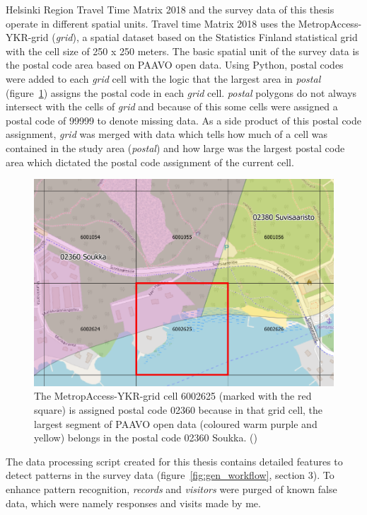 Helsinki Region Travel Time Matrix 2018 and the survey data of this thesis operate in different spatial units. Travel time Matrix 2018 uses the MetropAccess-YKR-grid (\textit{grid}), a spatial dataset based on the Statistics Finland statistical grid with the cell size of 250 x 250 meters. The basic spatial unit of the survey data is the postal code area based on PAAVO open data. Using Python, postal codes were added to each \textit{grid} cell with the logic that the largest area in \textit{postal} (figure~\ref{fig:paavo_ykr}) assigns the postal code in each \textit{grid} cell. \textit{postal} polygons do not always intersect with the cells of \textit{grid} and because of this some cells were assigned a postal code of 99999 to denote missing data. As a side product of this postal code assignment, \textit{grid} was merged with data which tells how much of a cell was contained in the study area (\textit{postal}) and how large was the largest postal code area which dictated the postal code assignment of the current cell.

\begin{figure}[H]%
    \includegraphics[width=\textwidth]{images/paavo-ykr.png}
    \caption[Assigning MetropAccess-YKR-grid postal codes]{The MetropAccess-YKR-grid cell 6002625 (marked with the red square) is assigned postal code 02360 because in that grid cell, the largest segment of PAAVO open data (coloured warm purple and yellow) belongs in the postal code 02360 Soukka. (\cite{OpenStreetMap})}%
    \label{fig:paavo_ykr}%
\end{figure}

The data processing script created for this thesis contains detailed features to detect patterns in the survey data (figure~\ref{fig:gen_workflow}, section 3). To enhance pattern recognition, \textit{records} and \textit{visitors} were purged of known false data, which were namely responses and visits made by me.

